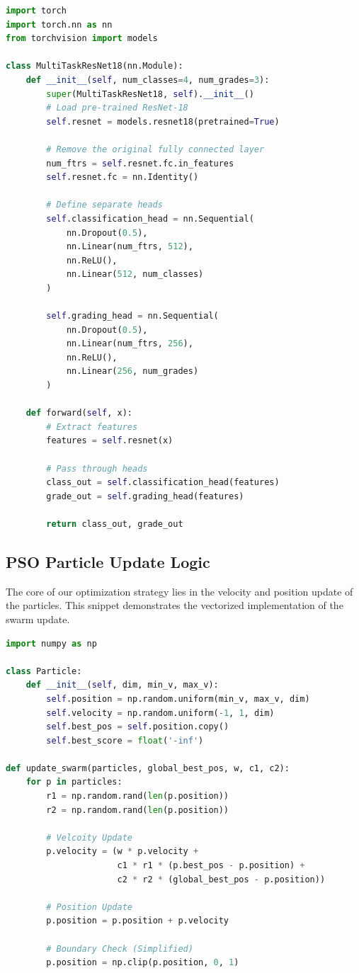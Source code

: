 \documentclass[journal]{IEEEtran}
\begin{document}
\begin{lstlisting}[language=Python, caption=Modified ResNet-18 Architecture]
import torch
import torch.nn as nn
from torchvision import models

class MultiTaskResNet18(nn.Module):
    def __init__(self, num_classes=4, num_grades=3):
        super(MultiTaskResNet18, self).__init__()
        # Load pre-trained ResNet-18
        self.resnet = models.resnet18(pretrained=True)
        
        # Remove the original fully connected layer
        num_ftrs = self.resnet.fc.in_features
        self.resnet.fc = nn.Identity()
        
        # Define separate heads
        self.classification_head = nn.Sequential(
            nn.Dropout(0.5),
            nn.Linear(num_ftrs, 512),
            nn.ReLU(),
            nn.Linear(512, num_classes)
        )
        
        self.grading_head = nn.Sequential(
            nn.Dropout(0.5),
            nn.Linear(num_ftrs, 256),
            nn.ReLU(),
            nn.Linear(256, num_grades)
        )

    def forward(self, x):
        # Extract features
        features = self.resnet(x)
        
        # Pass through heads
        class_out = self.classification_head(features)
        grade_out = self.grading_head(features)
        
        return class_out, grade_out
\end{lstlisting}

\subsection{PSO Particle Update Logic}
The core of our optimization strategy lies in the velocity and position update of the particles. This snippet demonstrates the vectorized implementation of the swarm update.

\begin{lstlisting}[language=Python, caption=PSO Update Mechanism]
import numpy as np

class Particle:
    def __init__(self, dim, min_v, max_v):
        self.position = np.random.uniform(min_v, max_v, dim)
        self.velocity = np.random.uniform(-1, 1, dim)
        self.best_pos = self.position.copy()
        self.best_score = float('-inf')

def update_swarm(particles, global_best_pos, w, c1, c2):
    for p in particles:
        r1 = np.random.rand(len(p.position))
        r2 = np.random.rand(len(p.position))
        
        # Velcoity Update
        p.velocity = (w * p.velocity + 
                      c1 * r1 * (p.best_pos - p.position) + 
                      c2 * r2 * (global_best_pos - p.position))
        
        # Position Update
        p.position = p.position + p.velocity
        
        # Boundary Check (Simplified)
        p.position = np.clip(p.position, 0, 1)
\end{lstlisting}
\end{document}
